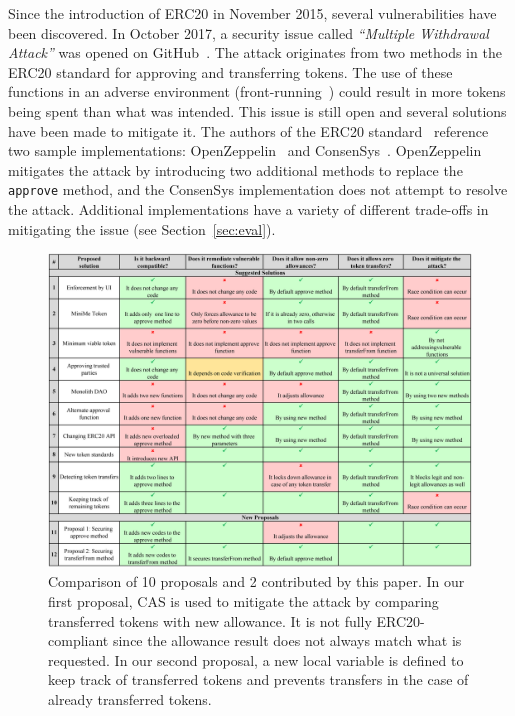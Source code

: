 Since the introduction of ERC20 in November 2015, several vulnerabilities have been discovered. In October 2017, a security issue called \textit{``Multiple Withdrawal Attack''} was opened on GitHub~\cite{Ref13,Ref07}. The attack originates from two methods in the ERC20 standard for approving and transferring tokens. The use of these functions in an adverse environment (\eg front-running~\cite{eskandari2019sok}) could result in more tokens being spent than what was intended. This issue is still open and several solutions have been made to mitigate it. The authors of the ERC20 standard~\cite{Ref08} reference two sample implementations: OpenZeppelin~\cite{Ref10} and ConsenSys~\cite{Ref11}. OpenZeppelin mitigates the attack by introducing two additional methods to replace the \texttt{approve} method, and the ConsenSys implementation does not attempt to resolve the attack. Additional implementations have a variety of different trade-offs in mitigating the issue (see Section~\ref{sec:eval}).

\begin{figure}[t]
\includegraphics[width=\textwidth]{figures/multiple_withdrawal_04_wide.png}
\caption{Comparison of 10 proposals and 2 contributed by this paper. In our first proposal, CAS is used to mitigate the attack by comparing transferred tokens with new allowance. It is not fully ERC20-compliant since the allowance result does not always match what is requested. In our second proposal, a new local variable is defined to keep track of transferred tokens and prevents transfers in the case of already transferred tokens.\label{tab:comp}}
\end{figure}

